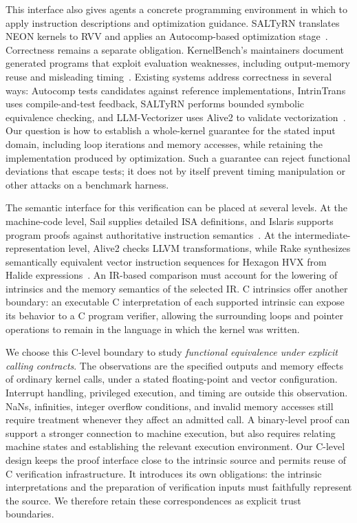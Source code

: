 This interface also gives agents a concrete programming environment in which to apply instruction descriptions and optimization guidance. SALTyRN translates NEON kernels to RVV and applies an Autocomp-based optimization stage~\cite{saltyrn}. Correctness remains a separate obligation. KernelBench's maintainers document generated programs that exploit evaluation weaknesses, including output-memory reuse and misleading timing~\cite{kernelbench-eval}. Existing systems address correctness in several ways: Autocomp tests candidates against reference implementations, IntrinTrans uses compile-and-test feedback, SALTyRN performs bounded symbolic equivalence checking, and LLM-Vectorizer uses Alive2 to validate vectorization~\cite{autocomp,intrintrans,saltyrn,llm-vectorizer}. Our question is how to establish a whole-kernel guarantee for the stated input domain, including loop iterations and memory accesses, while retaining the implementation produced by optimization. Such a guarantee can reject functional deviations that escape tests; it does not by itself prevent timing manipulation or other attacks on a benchmark harness.

The semantic interface for this verification can be placed at several levels. At the machine-code level, Sail supplies detailed ISA definitions, and Islaris supports program proofs against authoritative instruction semantics~\cite{sail,islaris}. At the intermediate-representation level, Alive2 checks LLVM transformations, while Rake synthesizes semantically equivalent vector instruction sequences for Hexagon HVX from Halide expressions~\cite{alive2,rake}. An IR-based comparison must account for the lowering of intrinsics and the memory semantics of the selected IR. C intrinsics offer another boundary: an executable C interpretation of each supported intrinsic can expose its behavior to a C program verifier, allowing the surrounding loops and pointer operations to remain in the language in which the kernel was written.

We choose this C-level boundary to study \emph{functional equivalence under explicit calling contracts}. The observations are the specified outputs and memory effects of ordinary kernel calls, under a stated floating-point and vector configuration. Interrupt handling, privileged execution, and timing are outside this observation. NaNs, infinities, integer overflow conditions, and invalid memory accesses still require treatment whenever they affect an admitted call. A binary-level proof can support a stronger connection to machine execution, but also requires relating machine states and establishing the relevant execution environment. Our C-level design keeps the proof interface close to the intrinsic source and permits reuse of C verification infrastructure. It introduces its own obligations: the intrinsic interpretations and the preparation of verification inputs must faithfully represent the source. We therefore retain these correspondences as explicit trust boundaries.

